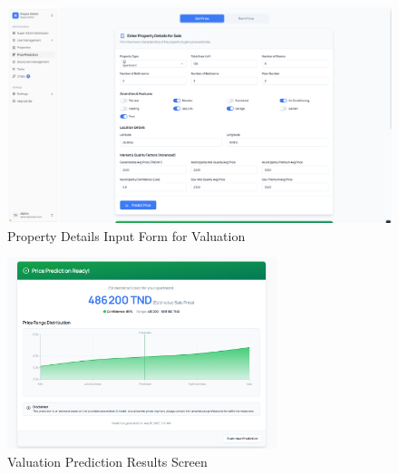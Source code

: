 \begin{figure}[htbp]
        \centering
        \includegraphics[width=1\textwidth]{images/screenshot_form_predition.png}
        \caption{Property Details Input Form for Valuation}
        \label{fig:prediction-form}
    \end{figure}
\begin{figure}[htbp]
        \centering
        \includegraphics[width=0.7\textwidth]{images/screenshot_predctionscreen.png}
        \caption{Valuation Prediction Results Screen}
        \label{fig:prediction-results}
\end{figure}
\newpage





